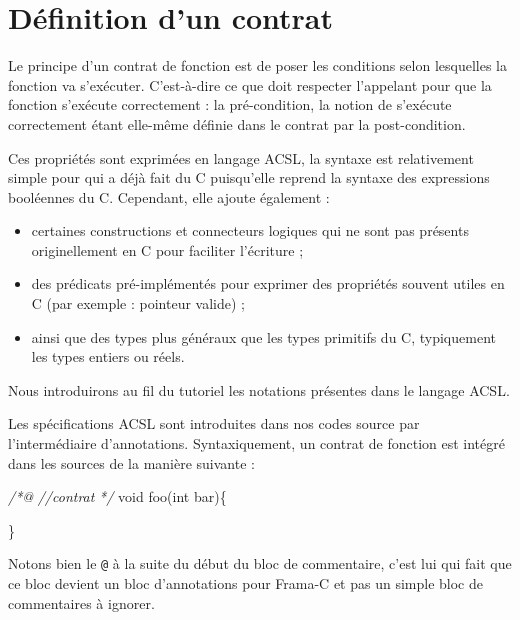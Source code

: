 \documentclass[12pt,francais,]{scrbook}
\newenvironment{Shaded}{}{}
\newcommand{\DataTypeTok}[1]{\textcolor[rgb]{0.56,0.13,0.00}{{#1}}}
\newcommand{\CommentTok}[1]{\textcolor[rgb]{0.38,0.63,0.69}{\textit{{#1}}}}
\newcommand{\NormalTok}[1]{{#1}}
\providecommand{\tightlist}{%
  \setlength{\itemsep}{0pt}\setlength{\parskip}{0pt}}
\begin{document}
\section{Définition d'un contrat}\label{duxe9finition-dun-contrat}

Le principe d'un contrat de fonction est de poser les conditions selon
lesquelles la fonction va s'exécuter. C'est-à-dire ce que doit respecter
l'appelant pour que la fonction s'exécute correctement : la
pré-condition, la notion de \og{}s'exécute correctement\fg{} étant elle-même
définie dans le contrat par la post-condition.

Ces propriétés sont exprimées en langage ACSL, la syntaxe est
relativement simple pour qui a déjà fait du C puisqu'elle reprend la
syntaxe des expressions booléennes du C. Cependant, elle ajoute
également :

\begin{itemize}
\tightlist
\item
  certaines constructions et connecteurs logiques qui ne sont pas
  présents originellement en C pour faciliter l'écriture ;
\item
  des prédicats pré-implémentés pour exprimer des propriétés souvent
  utiles en C (par exemple : pointeur valide) ;
\item
  ainsi que des types plus généraux que les types primitifs du C,
  typiquement les types entiers ou réels.
\end{itemize}

Nous introduirons au fil du tutoriel les notations présentes dans le
langage ACSL.

Les spécifications ACSL sont introduites dans nos codes source par
l'intermédiaire d'annotations. Syntaxiquement, un contrat de fonction
est intégré dans les sources de la manière suivante :

\begin{footnotesize}\begin{Shaded}
\begin{Highlighting}[]
\CommentTok{/*@}
\CommentTok{  //contrat}
\CommentTok{*/}
\DataTypeTok{void} \NormalTok{foo(}\DataTypeTok{int} \NormalTok{bar)\{}

\NormalTok{\}}
\end{Highlighting}
\end{Shaded}\end{footnotesize}

Notons bien le \texttt{@} à la suite du début du bloc de commentaire,
c'est lui qui fait que ce bloc devient un bloc d'annotations pour
Frama-C et pas un simple bloc de commentaires à ignorer.
\end{document}
